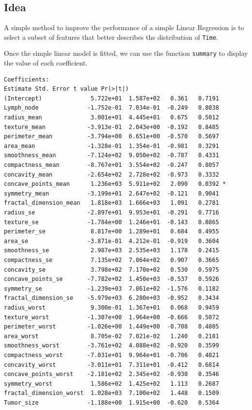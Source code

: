 \documentclass[]{report}
\begin{document}
\subsection{Idea}
A simple method to improve the performance of a simple Linear Regression is to select a subset of features that better describes the distribution of \texttt{Time}.

Once the simple linear model is fitted, we can use the function \texttt{summary} to display the value of each coefficient.
\begin{verbatim}
Coefficients:
Estimate Std. Error t value Pr(>|t|)  
(Intercept)              5.722e+01  1.587e+02   0.361   0.7191  
Lymph_node              -1.752e-01  7.034e-01  -0.249   0.8038  
radius_mean              3.001e+01  4.445e+01   0.675   0.5012  
texture_mean            -3.913e-01  2.043e+00  -0.192   0.8485  
perimeter_mean          -3.794e+00  6.651e+00  -0.570   0.5697  
area_mean               -1.328e-01  1.354e-01  -0.981   0.3291  
smoothness_mean         -7.124e+02  9.050e+02  -0.787   0.4331  
compactness_mean        -8.767e+01  3.554e+02  -0.247   0.8057  
concavity_mean          -2.654e+02  2.728e+02  -0.973   0.3332  
concave_points_mean      1.236e+03  5.911e+02   2.090   0.0392 *
symmetry_mean           -3.199e+01  2.647e+02  -0.121   0.9041  
fractal_dimension_mean   1.818e+03  1.666e+03   1.091   0.2781  
radius_se               -2.897e+01  9.953e+01  -0.291   0.7716  
texture_se              -1.784e+00  1.246e+01  -0.143   0.8865  
perimeter_se             8.817e+00  1.289e+01   0.684   0.4955  
area_se                 -3.871e-01  4.212e-01  -0.919   0.3604  
smoothness_se            2.987e+03  2.535e+03   1.178   0.2415  
compactness_se           7.135e+02  7.864e+02   0.907   0.3665  
concavity_se             3.798e+02  7.170e+02   0.530   0.5975  
concave_points_se       -7.782e+02  1.450e+03  -0.537   0.5926  
symmetry_se             -1.239e+03  7.861e+02  -1.576   0.1182  
fractal_dimension_se    -5.979e+03  6.280e+03  -0.952   0.3434  
radius_worst             9.300e-01  1.367e+01   0.068   0.9459  
texture_worst           -1.307e+00  1.964e+00  -0.666   0.5072  
perimeter_worst         -1.026e+00  1.449e+00  -0.708   0.4805  
area_worst               8.705e-02  7.021e-02   1.240   0.2181  
smoothness_worst        -3.761e+02  4.088e+02  -0.920   0.3599  
compactness_worst       -7.031e+01  9.964e+01  -0.706   0.4821  
concavity_worst         -3.011e+01  7.311e+01  -0.412   0.6814  
concave_points_worst    -2.181e+02  2.345e+02  -0.930   0.3546  
symmetry_worst           1.586e+02  1.425e+02   1.113   0.2687  
fractal_dimension_worst  1.028e+03  7.100e+02   1.448   0.1509  
Tumor_size              -1.188e+00  1.915e+00  -0.620   0.5364  
\end{verbatim}
\end{document}
